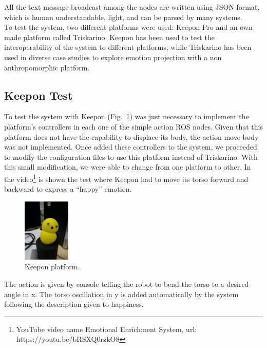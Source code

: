 All the text message broadcast among the nodes are written using JSON format, which is human understandable, light, and can be parsed by many systems.\\ 
To test the system, two different platforms were used: Keepon Pro %
and an own made platform called Triskarino.
Keepon has been used to test the interoperability of the system to different platforms, while Triskarino has been used in diverse case studies to explore emotion projection with a non anthropomorphic platform.
\subsection{Keepon Test}
To test the system with Keepon (Fig.~\ref{fig:keepon}) was just necessary to implement the platform's controllers in each one of the simple action ROS nodes. Given that this platform does not have the capability to displace its body, the action move body was not implemented. Once added these controllers to the system, we proceeded to modify the configuration files to use this platform instead of Triskarino. With this small modification, we were able to change from one platform to other. In the video\footnote{YouTube video name Emotional Enrichment System, url: https://youtu.be/bRSXQ0rzkO8}
is shown the test where Keepon had to move its torso forward and backward to express a ``happy'' emotion. 
\begin{figure}
	\centering
	\includegraphics[width=0.2\textwidth]{./Images/Keepon.jpg}
	\caption{Keepon platform.}
	\label{fig:keepon}
\end{figure} 
The action is given by console telling the robot to bend the torso to a desired angle in x. The torso oscillation in y is added automatically by the system following the description given to happiness. 
